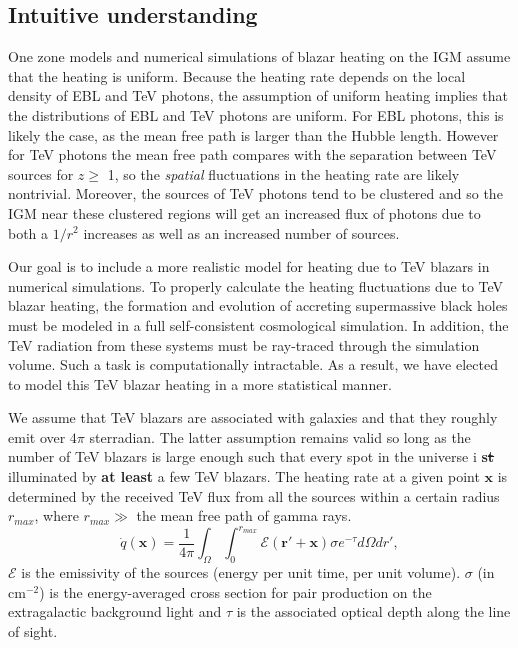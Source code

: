 \documentclass[twocolumns]{emulateapj}
\newcommand\ALc[1]{{\color{red} \bf #1}} %
\begin{document}
\subsection{Intuitive understanding}
One zone models \citep{2012ApJ...752...23C,2012ApJ...752...24P} and numerical simulations  \citep{2012MNRAS.423..149P} of blazar heating on the IGM assume that the heating is uniform.  Because the heating rate depends on the local density of EBL and TeV photons, the assumption of uniform heating implies that the distributions of EBL and TeV photons are uniform.  For EBL photons, this is likely the case, as the mean free path is larger than the Hubble length. However for TeV photons the mean free path compares with the separation between TeV sources for $z\geqslant$ 1, so the {\it spatial} fluctuations in the heating rate are likely nontrivial. Moreover, the sources of TeV photons tend to be clustered and so the IGM near these clustered regions will get an increased flux of photons due to both a $1/r^2$ increases as well as an increased number of sources.



Our goal is to include a more realistic model for heating due to TeV blazars in numerical simulations.
To properly calculate the heating fluctuations due to TeV blazar heating, the formation and evolution of accreting supermassive black holes must be modeled in a full self-consistent cosmological simulation.  In addition, the TeV radiation from these systems must be ray-traced through the simulation volume.  Such a task is computationally intractable.  As a result, we have elected to model this TeV blazar heating in a more statistical manner.  

We assume that TeV blazars are associated with galaxies and that they roughly emit over $4\pi$ sterradian.  The latter assumption remains valid so long as the number of TeV blazars is large enough such that every spot in the universe i\ALc{s\sout{t}} illuminated by \ALc{at least} a few TeV blazars. 
The heating rate at a given point $\mathbf{x}$ is determined by the received TeV flux from all the sources within a certain radius $r_{max}$, where $r_{max} \gg $ the mean free path of gamma rays. %
\begin{equation}
\label{eq:heating_rate}
  \dot{q}(\mathbf{x})= \frac{1}{4\pi}  \int_{\Omega}\int_0^{r_{max}}   \mathcal{E}(\mathbf{r}'+\mathbf{x})\sigma  e^{-\tau}d\Omega dr' ,
\end{equation}
$\mathcal{E}$ is the emissivity of the sources (energy per unit time, per unit volume). $\sigma$ (in cm$^{-2}$) is the energy-averaged cross section for pair production on the extragalactic background light and $\tau$ is the associated optical depth along the line of sight. %
\end{document}
